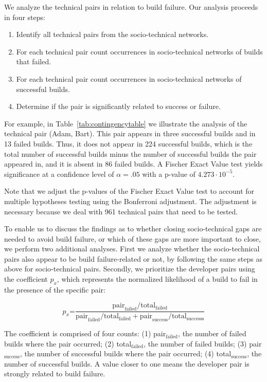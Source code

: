 We analyze the technical pairs in relation to build failure. 
Our analysis proceeds in four steps:

\begin{enumerate}
\item Identify all technical pairs from the socio-technical networks.
\item For each technical pair count occurrences in socio-technical networks of
builds that failed.
\item For each technical pair count occurrences in socio-technical networks of
successful builds.
\item Determine if the pair is significantly related to success or failure.
\end{enumerate}

For example, in Table~\ref{tab:contingencytable} we illustrate the analysis of
the technical pair (Adam, Bart). This pair appears in three successful builds and in
13 failed builds. Thus, it does not appear in 224 successful builds, which is the total number of successful builds minus the number of successful builds the pair appeared in, and it is absent in 86 failed builds.
A Fischer Exact Value test yields significance at a confidence level of $\alpha = .05$ with a p-value of $4.273\cdot10^{-5}$.

Note that we adjust the p-values of the Fischer Exact Value test to account for multiple hypotheses testing using the Bonferroni adjustment.
The adjustment is necessary because we deal with 961 technical pairs that need to be tested. 

To enable us to discuss the findings as to whether closing socio-technical gaps
are needed to avoid build failure, or which of these gaps are more important to
close, we perform two additional analyses. 
First we analyze whether the
socio-technical pairs also appear to be build failure-related or not, by
following the same steps as above for socio-technical pairs. 
%
Secondly, we prioritize the developer pairs using the coefficient $p_x$,
which represents the normalized likelihood of a build
to fail in the presence of the specific pair:

\begin{equation}
p_x\text{=}\frac{ \text{pair}_{\text{failed}} / \text{total}_{\text{failed}} }
                     { \text{pair}_{\text{failed}} / \text{total}_{\text{failed}} + \text{pair}_{\text{success}} / \text{total}_{\text{successs}}}
\end{equation}

The coefficient is comprised of four counts: (1) pair$_{\text{failed}}$, the number of failed builds where the pair occurred; (2) total$_{\text{failed}}$, the number of failed builds; (3) pair$_{\text{success}}$, the number of successful builds where the pair occurred; (4) total$_{\text{success}}$, the number of successful builds.
A value closer to one means the developer pair is strongly related to build
failure.




